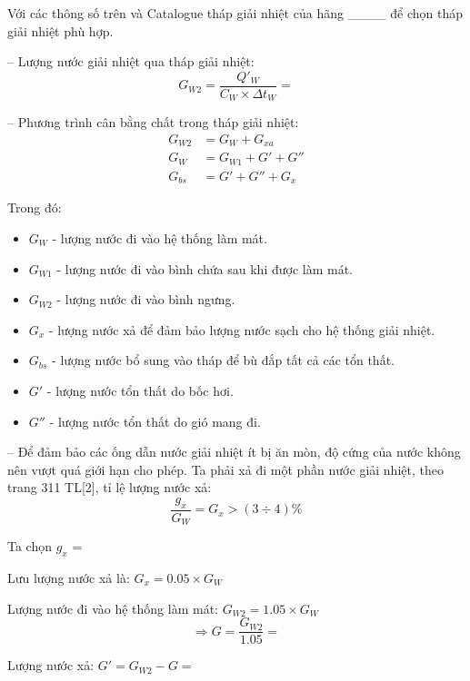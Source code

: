 Với các thông số trên và Catalogue tháp giải nhiệt của hãng \_\_\_\_ để chọn tháp giải nhiệt phù hợp.

-- Lượng nước giải nhiệt qua tháp giải nhiệt:
\begin{equation*}
	G_{W2} = \dfrac{Q'_{W}}{C_{W}\times\Delta t_{W}} = 
\end{equation*}

-- Phương trình cân bằng chất trong tháp giải nhiệt:
\begin{equation*}
	\begin{split}
		G_{W2} &= G_{W} + G_{xa} \\
		G_{W} &= G_{W1} + G' + G'' \\
		G_{bs} &= G' + G'' + G_{x}
	\end{split}
\end{equation*}

Trong đó:
\begin{itemize}
	\item $G_{W}$ - lượng nước đi vào hệ thống làm mát.
	\item $G_{W1}$ - lượng nước đi vào bình chứa sau khi được làm mát.
	\item $G_{W2}$ - lượng nước đi vào bình ngưng.
	\item $G_{x}$ - lượng nước xả để đảm bảo lượng nước sạch cho hệ thống giải nhiệt.
	\item $G_{bs}$ - lượng nước bổ sung vào tháp để bù đắp tất cả các tổn thất.
	\item $G'$ - lượng nước tổn thất do bốc hơi.
	\item $G''$ - lượng nước tổn thất do gió mang đi.
\end{itemize}

-- Để đảm bảo các ống dẫn nước giải nhiệt ít bị ăn mòn, độ cứng của nước không nên vượt quá giới hạn cho phép. Ta phải xả đi một phần nước giải nhiệt, theo trang 311 TL[2], tỉ lệ lượng nước xả:
\begin{equation*}
	\dfrac{g_{x}}{G_{W}} = G_{x} > (3 \div 4)\%
\end{equation*}

Ta chọn $g_{x}$ = 

Lưu lượng nước xả là: $G_{x} = 0.05\times G_{W}$

Lượng nước đi vào hệ thống làm mát: $G_{W2} = 1.05\times G_{W}$
\begin{equation*}
	\Rightarrow G = \dfrac{G_{W2}}{1.05} = 
\end{equation*}

Lượng nước xả: $G' = G_{W2} - G = $

